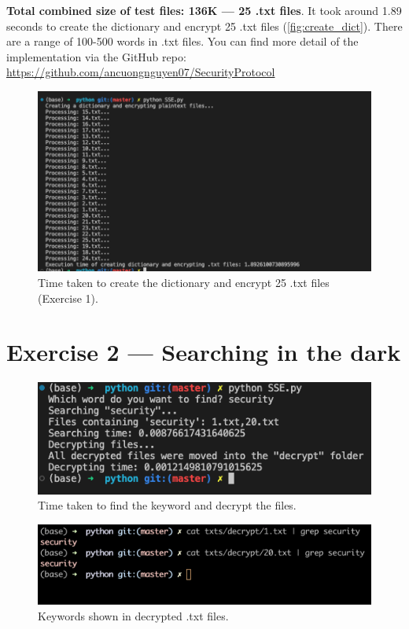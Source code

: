 \documentclass{article}
\begin{document}
\textbf{Total combined size of test files: 136K --- 25 .txt files}.
It took around 1.89 seconds to create the dictionary and encrypt
25 .txt files (\autoref{fig:create_dict}). There are a range of 100-500
words in .txt files. You can find more detail of the implementation
via the GitHub repo: \url{https://github.com/ancuongnguyen07/SecurityProtocol}

\begin{figure}[!hpt]
    \centering
    \includegraphics[height=\textheight,width=\textwidth,
    keepaspectratio]{create_dict_time_printing_included.png}
    \caption{Time taken to create the dictionary and encrypt 25 .txt files (Exercise 1).}
    \label{fig:create_dict}
\end{figure}

\section*{Exercise 2 --- Searching in the dark}

\begin{figure}[hpt]
    \centering
    \includegraphics[height=\textheight,width=\textwidth,
    keepaspectratio]{searching_decrypting_time.png}
    \caption{Time taken to find the keyword and decrypt the files.}
\end{figure}

\begin{figure}[hpt]
    \centering
    \includegraphics[height=\textheight,width=\textwidth,
    keepaspectratio]{keyword_in_decrypted_file.png}
    \caption{Keywords shown in decrypted .txt files.}
\end{figure}
\end{document}
